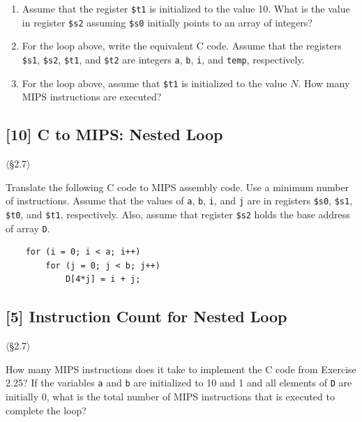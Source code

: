 \begin{enumerate}
  \item[2.24.1] [5] Assume that the register \texttt{\$t1} is initialized to the
        value 10. What is the value in register \texttt{\$s2} assuming
        \texttt{\$s0} initially points to an array of integers?
  \item[2.24.2] [5] For the loop above, write the equivalent C code. Assume that
        the registers \texttt{\$s1}, \texttt{\$s2}, \texttt{\$t1}, and
        \texttt{\$t2} are integers \texttt{a}, \texttt{b}, \texttt{i}, and
        \texttt{temp}, respectively.
  \item[2.24.3] [5] For the loop above, assume that \texttt{\$t1} is initialized
        to the value $N$. How many MIPS instructions are executed?
\end{enumerate}

\problembreak

\subsection{[10] C to MIPS: Nested Loop}
\hypertarget{prob-2.25}{}
\noindent$\langle$\S2.7$\rangle$\medskip

\noindent Translate the following C code to MIPS assembly code. Use a minimum
number of instructions. Assume that the values of \texttt{a}, \texttt{b},
\texttt{i}, and \texttt{j} are in registers \texttt{\$s0}, \texttt{\$s1},
\texttt{\$t0}, and \texttt{\$t1}, respectively. Also, assume that register
\texttt{\$s2} holds the base address of array \texttt{D}.
\begin{verbatim}
    for (i = 0; i < a; i++)
        for (j = 0; j < b; j++)
            D[4*j] = i + j;
\end{verbatim}

\problembreak

\subsection{[5] Instruction Count for Nested Loop}
\hypertarget{prob-2.26}{}
\noindent$\langle$\S2.7$\rangle$\medskip

\noindent How many MIPS instructions does it take to implement the C code from
Exercise 2.25? If the variables \texttt{a} and \texttt{b} are initialized to
10 and 1 and all elements of \texttt{D} are initially 0, what is the total
number of MIPS instructions that is executed to complete the loop?

